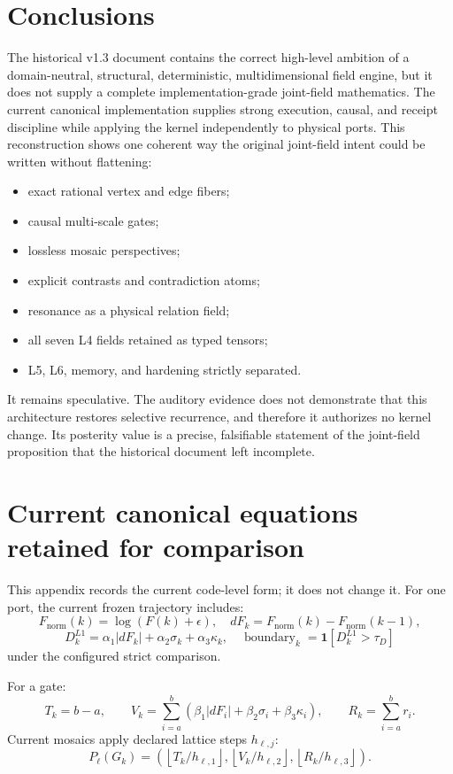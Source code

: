\documentclass[11pt,oneside]{article}
\begin{document}
\section{Conclusions}

The historical v1.3 document contains the correct high-level ambition of a
domain-neutral, structural, deterministic, multidimensional field engine, but
it does not supply a complete implementation-grade joint-field mathematics.
The current canonical implementation supplies strong execution, causal, and
receipt discipline while applying the kernel independently to physical ports.
This reconstruction shows one coherent way the original joint-field intent
could be written without flattening:
\begin{itemize}
  \item exact rational vertex and edge fibers;
  \item causal multi-scale gates;
  \item lossless mosaic perspectives;
  \item explicit contrasts and contradiction atoms;
  \item resonance as a physical relation field;
  \item all seven L4 fields retained as typed tensors;
  \item L5, L6, memory, and hardening strictly separated.
\end{itemize}

It remains speculative. The auditory evidence does not demonstrate that this
architecture restores selective recurrence, and therefore it authorizes no
kernel change. Its posterity value is a precise, falsifiable statement of the
joint-field proposition that the historical document left incomplete.

\appendix

\section{Current canonical equations retained for comparison}

This appendix records the current code-level form; it does not change it.
For one port, the current frozen trajectory includes:
\[
  F_{\mathrm{norm}}(k)=\log(F(k)+\epsilon),
\quad
  dF_k=F_{\mathrm{norm}}(k)-F_{\mathrm{norm}}(k-1),
\]
\[
  D^{L1}_k=\alpha_1|dF_k|+\alpha_2\sigma_k+\alpha_3\kappa_k,
\quad
  \operatorname{boundary}_k=
  \mathbf{1}[D^{L1}_k>\tau_D]
\]
under the configured strict comparison.

For a gate:
\[
  T_k=b-a,\qquad
  V_k=\sum_{i=a}^{b}
  (\beta_1|dF_i|+\beta_2\sigma_i+\beta_3\kappa_i),
\qquad
  R_k=\sum_{i=a}^{b}r_i.
\]
Current mosaics apply declared lattice steps \(h_{\ell,j}\):
\[
  P_\ell(G_k)=
  \left(
    \left\lfloor T_k/h_{\ell,1}\right\rfloor,
    \left\lfloor V_k/h_{\ell,2}\right\rfloor,
    \left\lfloor R_k/h_{\ell,3}\right\rfloor
  \right).
\]
\end{document}
